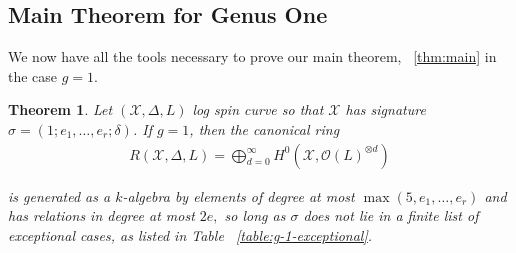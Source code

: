 \documentclass{amsart}
\theoremstyle{plain}
\newtheorem{thm}{Theorem}[section]
\theoremstyle{definition}
\newtheorem{example}[thm]{Example}
\theoremstyle{remark}
\numberwithin{equation}{section}
\newcommand\ssec{\subsection}
\newcommand \sx{\mathscr X}
\newcommand\sco{{\mathscr O}}
\newcommand \di{\text{div }}
\newcommand \halfcan{L}
\begin{document}
%
%
%


\ssec{Main Theorem for Genus One}
\label{ssec:main_g_1}

We now have all the tools necessary to prove our main theorem, ~\ref{thm:main} in the case $g = 1$. 

\begin{thm}
\label{thm:g-1-main}
Let $(\sx, \Delta, \halfcan)$ log spin curve so that $\sx$ has signature $\sigma = (1; e_1, \ldots, e_r; \delta)$.
If $g = 1$, then the canonical ring
\begin{align*}
	R(\sx, \Delta, \halfcan) = \bigoplus_{d = 0}^\infty H^0(\sx, \sco(L)^{\otimes d})
\end{align*}

\noindent
is generated as a $k$-algebra by elements of degree at most $\max(5, e_1, \ldots, e_r)$ and has relations in degree at most $2e,$ so long as $\sigma$ does not lie in a
finite list of exceptional cases, as listed in Table
~\ref{table:g-1-exceptional}.
\end{thm}
\end{document}
